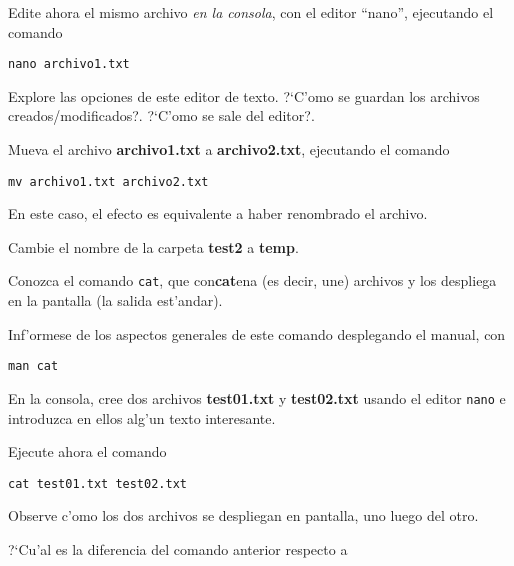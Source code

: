 \documentclass[11pt]{exam}
\begin{document}
\begin{questions}
\begin{parts}
\item Edite ahora el mismo archivo \textit{en la consola}, con el editor ``nano'', ejecutando el comando 

\begin{verbatim}
nano archivo1.txt
\end{verbatim}

 Explore las opciones de este editor de texto. ?`C'omo se guardan los archivos creados/modi\-fi\-ca\-dos?. ?`C'omo se sale del editor?.

\item Mueva el archivo \textbf{archivo1.txt} a \textbf{archivo2.txt}, ejecutando el comando

\begin{verbatim}
mv archivo1.txt archivo2.txt
\end{verbatim}

En este caso, el efecto es equivalente a haber renombrado el archivo.

\item Cambie el nombre de la carpeta \textbf{test2} a \textbf{temp}.

\end{parts}

\item Conozca el comando \texttt{cat}, que con\textbf{cat}ena (es decir, une) archivos y los despliega en la pantalla (la salida est'andar).
\begin{parts}
\item  Inf'ormese de los aspectos generales de este comando desplegando el manual, con 

\begin{verbatim}
man cat
\end{verbatim}



\item En la consola, cree dos archivos \textbf{test01.txt} y \textbf{test02.txt} usando el editor \texttt{nano} e introduzca en ellos alg'un texto interesante.

\item Ejecute ahora el comando 

\begin{verbatim}
cat test01.txt test02.txt
\end{verbatim}

Observe c'omo los dos archivos se despliegan en pantalla, uno luego del otro.

\item ?`Cu'al es la diferencia del comando anterior respecto a 


\end{parts}
\end{questions}
\end{document}
